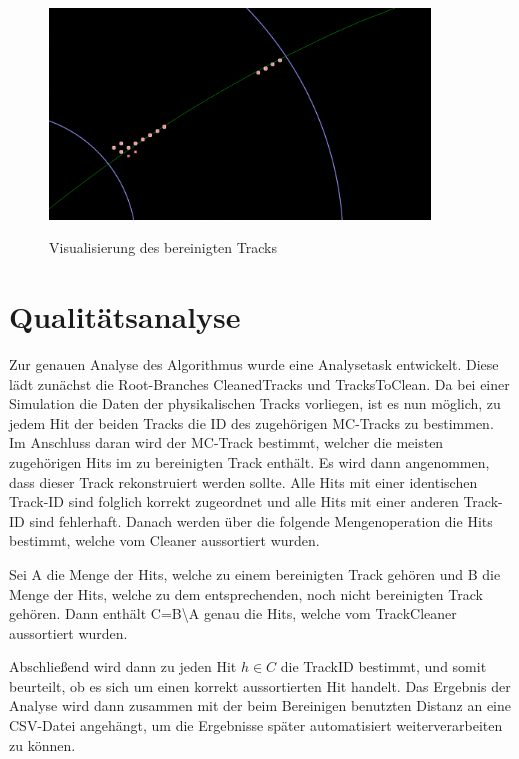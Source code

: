 \begin{figure}
  \includegraphics[width=0.9\textwidth]{Bilder/CleanedWithTrack}
	\label{fig:cleaned}
	\caption{Visualisierung des bereinigten Tracks}
\end{figure}

\section{Qualitätsanalyse}
Zur genauen Analyse des Algorithmus wurde eine Analysetask entwickelt. Diese lädt zunächst die Root-Branches CleanedTracks und TracksToClean. Da bei einer Simulation die Daten der physikalischen Tracks vorliegen, ist es nun möglich, zu jedem Hit der beiden Tracks die ID des zugehörigen MC-Tracks zu bestimmen. Im Anschluss daran wird der MC-Track bestimmt, welcher die meisten zugehörigen Hits im zu bereinigten Track enthält. Es wird dann angenommen, dass dieser Track rekonstruiert werden sollte. Alle Hits mit einer identischen Track-ID sind folglich korrekt zugeordnet und alle Hits mit einer anderen Track-ID sind fehlerhaft. Danach werden über die folgende Mengenoperation die Hits bestimmt, welche vom Cleaner aussortiert wurden.

\begin{Definition}
Sei A die Menge der Hits, welche zu einem bereinigten Track gehören und B die Menge der Hits, welche zu dem entsprechenden, noch nicht bereinigten Track gehören. Dann enthält C=B\textbackslash A genau die Hits, welche vom TrackCleaner aussortiert wurden.
\end{Definition}

Abschließend wird dann zu jeden Hit $ h \in C $ die TrackID bestimmt, und somit beurteilt, ob es sich um einen korrekt aussortierten Hit handelt. Das Ergebnis der Analyse wird dann zusammen mit der beim Bereinigen benutzten Distanz an eine CSV-Datei angehängt, um die Ergebnisse später automatisiert weiterverarbeiten zu können.

